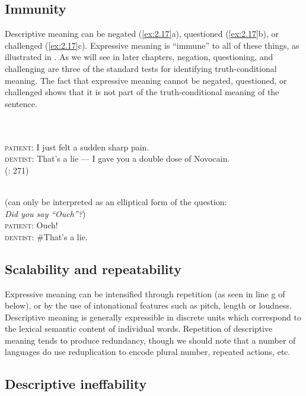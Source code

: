 \subsection{Immunity}\label{sec:2.6.3}

Descriptive meaning can be negated (\ref{ex:2.17}a), questioned (\ref{ex:2.17}b), or challenged (\ref{ex:2.17}c). Expressive meaning is “immune” to all of these things, as illustrated in . As we will see in later chapters, negation, questioning, and challenging are three of the standard tests for identifying truth-conditional meaning. The fact that expressive meaning cannot be negated, questioned, or challenged shows that it is not part of the truth-conditional meaning of the sentence.


\ea \label{ex:2.17}
\\
\\
\ex  \textsc{patient}:  {I just felt a sudden sharp pain.}\\
  \textsc{dentist}:  {That’s a lie — I gave you a double dose of Novocain.}\\
    (\citealt{Cruse1986}: 271)
\z
                       \z

\ea \label{ex:2.18}
\\
  (can only be interpreted as an elliptical form of the question:\\
     \textit{Did you say “Ouch”?})\\
\ex  \textsc{patient}:  {Ouch!}\\
  \textsc{dentist}: \#{That’s a lie.}
                       \z
\z

\subsection{Scalability and repeatability}\label{sec:2.6.4}

Expressive meaning can be intensified through repetition (as seen in line g of  below), or by the use of intonational features such as pitch, length or loudness. Descriptive meaning is generally expressible in discrete units which correspond to the lexical semantic content of individual words. Repetition of descriptive meaning tends to produce redundancy, though we should note that a number of languages do use reduplication to encode plural number, repeated actions, etc.


\subsection{Descriptive ineffability}\label{sec:2.6.5}

